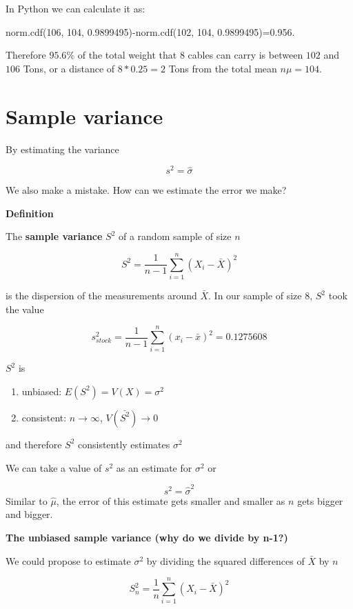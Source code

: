 \documentclass[
]{book}
\providecommand{\tightlist}{%
  \setlength{\itemsep}{0pt}\setlength{\parskip}{0pt}}
\begin{document}
In Python we can calculate it as:

norm.cdf(106, 104, 0.9899495)-norm.cdf(102, 104, 0.9899495)=0.956.

Therefore \(95.6\%\) of the total weight that \(8\) cables can carry is between \(102\) and \(106\) Tons, or a distance of \(8*0.25=2\) Tons from the total mean \(n\mu=104\).

\hypertarget{sample-variance-1}{%
\section{Sample variance}\label{sample-variance-1}}

By estimating the variance

\[s^2=\hat{\sigma}\]

We also make a mistake. How can we estimate the error we make?

\textbf{Definition}

The \textbf{sample variance} \(S^2\) of a random sample of size \(n\)

\[S^2= \frac{1}{n-1}\sum_{i=1}^n(X_i-\bar{X})^2\]

is the dispersion of the measurements around \(\bar{X}\). In our sample of size \(8\), \(S^2\) took the value

\[s_{stock}^2=\frac{1}{n-1}\sum_{i=1}^n(x_i-\bar{x})^2=0.1275608\]

\(S^2\) is

\begin{enumerate}
\def\labelenumi{\arabic{enumi})}
\tightlist
\item
  unbiased: \(E(S^2)=V(X)=\sigma^2\)
\item
  consistent: \(n \rightarrow \infty\), \(V(\bar{S^2}) \rightarrow 0\)
\end{enumerate}

and therefore \(S^2\) consistently estimates \(\sigma^2\)

We can take a value of \(s^2\) as an estimate for \(\sigma^2\) or

\[s^2=\hat{\sigma}^2\]
Similar to \(\hat{\mu}\), the error of this estimate gets smaller and smaller as \(n\) gets bigger and bigger.

\textbf{The unbiased sample variance (why do we divide by n-1?)}

We could propose to estimate \(\sigma^2\) by dividing the squared differences of \(\bar{X}\) by \(n\)

\[S_n^2=\frac{1}{n}\sum_{i=1}^n(X_i-\bar{X})^2\]
\end{document}
